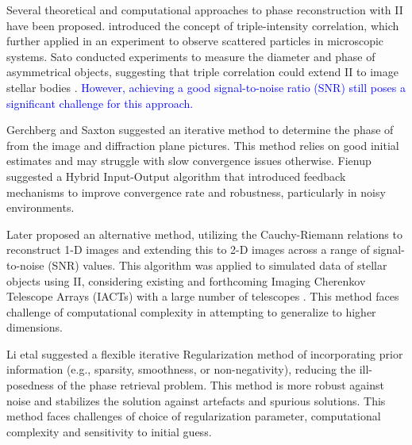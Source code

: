 Several theoretical and computational approaches to phase reconstruction 
with II have been proposed. \cite{gamo1963triple} introduced the concept 
of triple-intensity correlation, which \cite{goldberger1963use} further 
applied in an experiment to observe scattered particles in microscopic systems. 
Sato conducted experiments to measure the diameter and phase of asymmetrical 
objects, suggesting that triple correlation could extend II to image stellar 
bodies \citep{sato1978imaging, sato1979computer, sato1981adaptive}. \textcolor{blue}{However, achieving a good signal-to-noise ratio (SNR) still poses a significant challenge for this approach.}

Gerchberg and Saxton suggested an iterative method \cite{GerchbergSaxton1972}to determine the phase of from the image and diffraction plane pictures. This method relies on good initial estimates and may struggle with slow convergence issues otherwise. Fienup suggested a Hybrid Input-Output algorithm that introduced feedback mechanisms to improve convergence rate and robustness, particularly in noisy environments.

Later \cite{holmes2010two} proposed an alternative method, utilizing the 
Cauchy-Riemann relations to reconstruct 1-D images and extending this to 
2-D images across a range of signal-to-noise (SNR) values. This algorithm 
was applied to simulated data of stellar objects using II, considering 
existing and forthcoming Imaging Cherenkov Telescope Arrays (IACTs) with 
a large number of telescopes 
\citep{nunez2010stellar, nunez2012high, nunez2012imaging}. This method faces challenge of computational complexity in attempting to generalize to higher dimensions. 

Li etal suggested a flexible iterative Regularization method \citep{Li2014} of incorporating prior information (e.g., sparsity, smoothness, or non-negativity), reducing the ill-posedness of the phase retrieval problem. This method is more robust against noise and stabilizes the solution against artefacts and spurious solutions. This method faces challenges of choice of regularization parameter, computational complexity and sensitivity to initial guess.  

